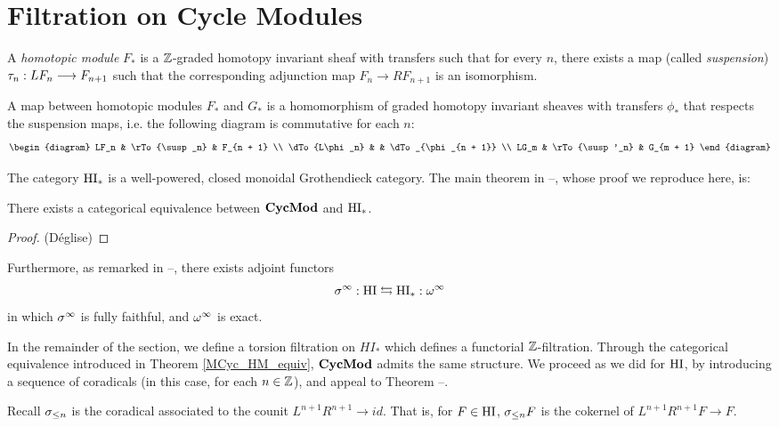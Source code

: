\section{Filtration on Cycle Modules}


\begin{definition}
A \emph{homotopic module} $F_*$ is a $\mathbb{Z}$-graded homotopy 
invariant sheaf with transfers such that for every $n$, there
exists a map (called \emph{suspension}) $\tau_n: LF_n \longrightarrow F_{n+1}$
such that the corresponding adjunction map $F_n \to RF_{n+1}$
is an isomorphism.

A map between homotopic modules $F_*$ and $G_*$ is a homomorphism 
of graded homotopy invariant sheaves with transfers $\phi_*$ that 
respects the suspension maps, i.e. the following diagram is 
commutative for each $n$:
\[
\begin{diagram}
LF_n          & \rTo{\susp_n}  & F_{n + 1}          \\
\dTo{L\phi_n} &                & \dTo_{\phi_{n + 1}} \\
LG_m          & \rTo{\susp'_n} & G_{m + 1}
\end{diagram}
\]
\end{definition}

The category $\mathrm{HI}_*$ is a well-powered, closed monoidal 
Grothendieck category. The main theorem in --, whose proof we 
reproduce here, is:

\begin{thm}\label{MCyc_HM_equiv}
There exists a categorical equivalence between $\mathbf{CycMod}$
and $\mathrm{HI}_*$.
\end{thm}
\begin{proof}(D\'eglise)
\end{proof}

Furthermore, as remarked in --, there exists adjoint functors
\[
\sigma^\infty: \mathrm{HI} \leftrightarrows \mathrm{HI}_* : \omega^\infty
\]
in which $\sigma^\infty$ is fully faithful, and $\omega^\infty$ is exact.

In the remainder of the section, we define a torsion filtration on
$HI_*$ which defines a functorial $\mathbb{Z}$-filtration. Through the 
categorical equivalence introduced in Theorem \ref{MCyc_HM_equiv}, 
$\mathbf{CycMod}$ admits the same structure. We proceed as we did for 
$\mathrm{HI}$, by introducing a sequence of coradicals (in this case, for 
each $n \in \mathbb{Z}$), and appeal to Theorem --.

Recall $\sigma_{\leq n}$ is the coradical associated to the counit
$L^{n + 1}R^{n + 1} \to id$. That is, for $F \in \mathrm{HI}$, $\sigma_{\leq n}F$
is the cokernel of $L^{n + 1}R^{n + 1}F \to F$.

